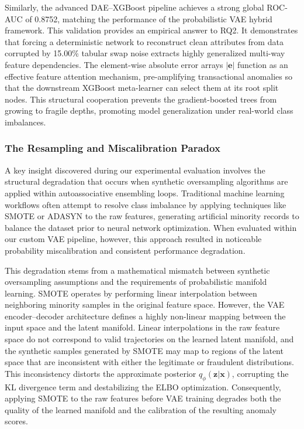 Similarly, the advanced DAE--XGBoost pipeline achieves a strong global ROC-AUC of 0.8752, matching the performance of the probabilistic VAE hybrid framework. This validation provides an empirical answer to RQ2. It demonstrates that forcing a deterministic network to reconstruct clean attributes from data corrupted by 15.00\% tabular swap noise extracts highly generalized multi-way feature dependencies. The element-wise absolute error arrays $|\mathbf{e}|$ function as an effective feature attention mechanism, pre-amplifying transactional anomalies so that the downstream XGBoost meta-learner can select them at its root split nodes. This structural cooperation prevents the gradient-boosted trees from growing to fragile depths, promoting model generalization under real-world class imbalances.

\subsubsection{The Resampling and Miscalibration Paradox}

A key insight discovered during our experimental evaluation involves the structural degradation that occurs when synthetic oversampling algorithms are applied within autoassociative ensembling loops. Traditional machine learning workflows often attempt to resolve class imbalance by applying techniques like SMOTE or ADASYN to the raw features, generating artificial minority records to balance the dataset prior to neural network optimization. When evaluated within our custom VAE pipeline, however, this approach resulted in noticeable probability miscalibration and consistent performance degradation.

This degradation stems from a mathematical mismatch between synthetic oversampling assumptions and the requirements of probabilistic manifold learning. SMOTE operates by performing linear interpolation between neighboring minority samples in the original feature space. However, the VAE encoder--decoder architecture defines a highly non-linear mapping between the input space and the latent manifold. Linear interpolations in the raw feature space do not correspond to valid trajectories on the learned latent manifold, and the synthetic samples generated by SMOTE may map to regions of the latent space that are inconsistent with either the legitimate or fraudulent distributions. This inconsistency distorts the approximate posterior $q_\phi(\mathbf{z}|\mathbf{x})$, corrupting the KL divergence term and destabilizing the ELBO optimization. Consequently, applying SMOTE to the raw features before VAE training degrades both the quality of the learned manifold and the calibration of the resulting anomaly scores.

